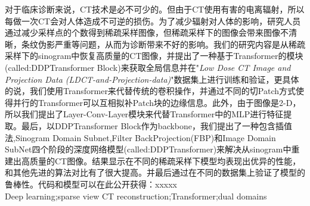 对于临床诊断来说，CT技术是必不可少的。但由于CT使用有害的电离辐射，所以每做一次CT会对人体造成不可逆的损伤。为了减少辐射对人体的影响，研究人员通过减少采样点的个数得到稀疏采样图像，但稀疏采样下的图像会带来图像不清晰，条纹伪影严重等问题，从而为诊断带来不好的影响。我们的研究内容是从稀疏采样下的sinogram中恢复高质量的CT图像，并提出了一种基于Transformer的模块(called:DDPTransformer Block)来获取全局信息并在"\emph{Low Dose CT Image and Projection Data (LDCT-and-Projection-data)}"数据集上进行训练和验证，更具体的说，我们使用Transformer来代替传统的卷积操作，并通过不同的切Patch方式使得并行的Transformer可以互相拟补Patch块的边缘信息。此外，由于图像是2-D，所以我们提出了Layer-Conv-Layer模块来代替Transformer中的MLP进行特征提取。最后，以DDPTransformer Block作为backbone，我们提出了一种包含插值法,Sinogram Domain Subnet,Filter BackProjection(FBP)和Image Domain SubNet四个阶段的深度网络模型(called:DDPTransformer)来解决从sinogram中重建出高质量的CT图像。结果显示在不同的稀疏采样下模型均表现出优异的性能，和其他先进的算法对比有了很大提高。并最后通过在不同的数据集上验证了模型的鲁棒性。代码和模型可以在此公开获得：xxxxx\\

Deep learning;sparse view CT reconstruction;Transformer;dual domains